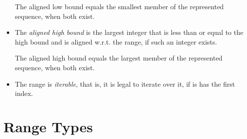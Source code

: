 \begin{itemize}
  The aligned low bound equals the smallest member of the represented
  sequence, when both exist.

\item The \emph{aligned high bound} is the largest integer that is
  less than or equal to the high bound and is aligned w.r.t. the range,
  if such an integer exists.

  The aligned high bound equals the largest member of the represented
  sequence, when both exist.

%

\item The range is \emph{iterable}, that is, it is legal to iterate over it,
  if is has the first index.

\end{itemize}



\section{Range Types}
\label{Range_Types}

